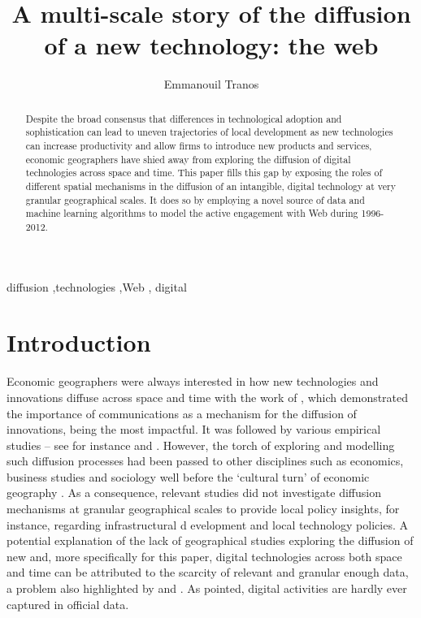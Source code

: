 \documentclass[
  authoryear,
  preprint,
  3p]{elsarticle}
\begin{document}
\begin{frontmatter}
\title{A multi-scale story of the diffusion of a new technology: the
web}
\author[1]{Emmanouil Tranos%
%
}



        
\begin{abstract}
Despite the broad consensus that differences in technological adoption
and sophistication can lead to uneven trajectories of local development
as new technologies can increase productivity and allow firms to
introduce new products and services, economic geographers have shied
away from exploring the diffusion of digital technologies across space
and time. This paper fills this gap by exposing the roles of different
spatial mechanisms in the diffusion of an intangible, digital technology
at very granular geographical scales. It does so by employing a novel
source of data and machine learning algorithms to model the active
engagement with Web during 1996-2012.
\end{abstract}





\begin{keyword}
    diffusion \sep technologies \sep Web \sep 
    digital
\end{keyword}
\end{frontmatter}
    

\section{Introduction}\label{sec-introduction}

Economic geographers were always interested in how new technologies and
innovations diffuse across space and time with the work of
\citet{hagerstrand1968innovation}, which demonstrated the importance of
communications as a mechanism for the diffusion of innovations, being
the most impactful. It was followed by various empirical studies -- see
for instance \citet{ormrod1990} and \citet{iso2005}. However, the torch
of exploring and modelling such diffusion processes had been passed to
other disciplines such as economics, business studies and sociology well
before the `cultural turn' of economic geography
\citep{perkins2005international, ding2010modeling}. As a consequence,
relevant studies did not investigate diffusion mechanisms at granular
geographical scales to provide local policy insights, for instance,
regarding infrastructural d evelopment and local technology policies. A
potential explanation of the lack of geographical studies exploring the
diffusion of new and, more specifically for this paper, digital
technologies across both space and time can be attributed to the
scarcity of relevant and granular enough data, a problem also
highlighted by \citet{iso2005} and \citet{kemeny2011international}. As
\citet{zook2022mapping} pointed, digital activities are hardly ever
captured in official data.
\end{document}
